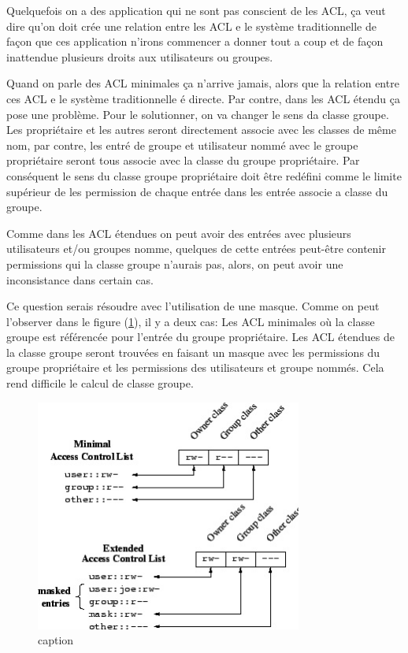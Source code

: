Quelquefois on a des application qui ne sont pas conscient de les ACL, ça veut dire qu'on doit crée une relation entre les ACL e le système traditionnelle de façon que ces application n'irons commencer a donner tout a coup et de façon inattendue plusieurs droits aux utilisateurs ou groupes. 

Quand on parle des ACL minimales ça n'arrive jamais, alors que la relation entre ces ACL e le système traditionnelle é directe. Par contre, dans les ACL étendu ça pose une problème. Pour le solutionner, on va changer le sens da classe groupe. Les propriétaire et les autres seront directement associe avec les classes de même nom, par contre, les entré de groupe et utilisateur nommé avec le groupe propriétaire seront tous associe avec la classe du groupe propriétaire. Par conséquent le sens du classe groupe propriétaire doit être redéfini comme le limite supérieur de les permission de chaque entrée dans les entrée associe a classe du groupe.

Comme dans les ACL étendues on peut avoir des entrées avec plusieurs utilisateurs et/ou groupes nomme, quelques de cette entrées peut-être contenir permissions qui la classe groupe n'aurais pas, alors, on peut avoir une inconsistance dans certain cas. 

Ce question serais résoudre avec l'utilisation de une masque. Comme on peut l'observer dans le figure (\ref{fig:img_acl-mapping}), il y a deux cas:  Les ACL minimales où la classe groupe est référencée pour l'entrée du groupe propriétaire. Les ACL étendues de la classe groupe seront trouvées en faisant un masque avec les permissions du groupe propriétaire et les permissions des utilisateurs et groupe nommés. Cela rend difficile le calcul de classe groupe. 

\begin{figure}[htbp]
\centering
\includegraphics[height=3in]{img/acl-mapping.jpg}
\caption{caption}
\label{fig:img_acl-mapping}
\end{figure}
 
